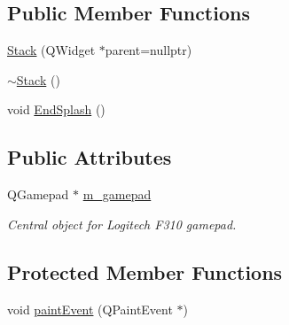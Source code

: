 \subsection*{Public Member Functions}
\begin{DoxyCompactItemize}
\item 
\mbox{\hyperlink{classStack_aa9d4cb23f0d4ade8db1df8624629cc14}{Stack}} (Q\+Widget $\ast$parent=nullptr)
\item 
\mbox{\hyperlink{classStack_a40bd5dff912f0e5290777c4b46d17809}{$\sim$\+Stack}} ()
\item 
void \mbox{\hyperlink{classStack_ac608632a7155f01a24a9713f5fde915e}{End\+Splash}} ()
\end{DoxyCompactItemize}
\subsection*{Public Attributes}
\begin{DoxyCompactItemize}
\item 
Q\+Gamepad $\ast$ \mbox{\hyperlink{classStack_a63dddeeffcc3340219b93b716f9b8bc9}{m\+\_\+gamepad}}
\begin{DoxyCompactList}\small\item\em Central object for Logitech F310 gamepad. \end{DoxyCompactList}\end{DoxyCompactItemize}
\subsection*{Protected Member Functions}
\begin{DoxyCompactItemize}
\item 
void \mbox{\hyperlink{classStack_a58526db5899d5e03a6ad306a96f91d62}{paint\+Event}} (Q\+Paint\+Event $\ast$)
\end{DoxyCompactItemize}

